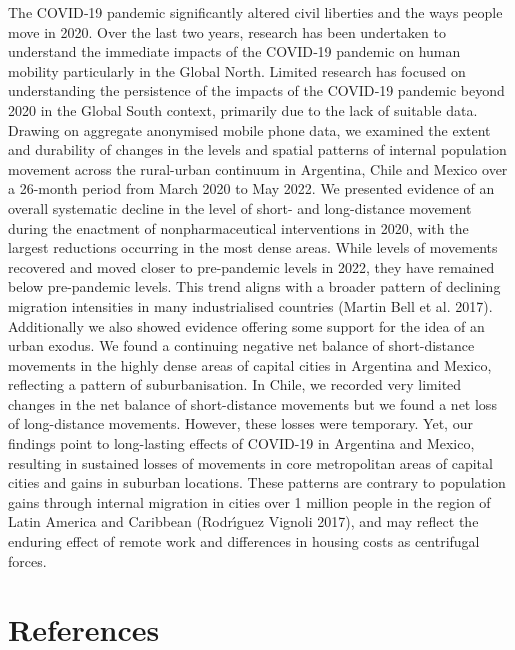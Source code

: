 \documentclass[
  11pt,
]{article}
\begin{document}
The COVID‐19 pandemic significantly altered civil liberties and the ways
people move in 2020. Over the last two years, research has been
undertaken to understand the immediate impacts of the COVID‐19 pandemic
on human mobility particularly in the Global North. Limited research has
focused on understanding the persistence of the impacts of the COVID‐19
pandemic beyond 2020 in the Global South context, primarily due to the
lack of suitable data. Drawing on aggregate anonymised mobile phone
data, we examined the extent and durability of changes in the levels and
spatial patterns of internal population movement across the rural-urban
continuum in Argentina, Chile and Mexico over a 26-month period from
March 2020 to May 2022. We presented evidence of an overall systematic
decline in the level of short- and long-distance movement during the
enactment of nonpharmaceutical interventions in 2020, with the largest
reductions occurring in the most dense areas. While levels of movements
recovered and moved closer to pre-pandemic levels in 2022, they have
remained below pre-pandemic levels. This trend aligns with a broader
pattern of declining migration intensities in many industrialised
countries (Martin Bell et al. 2017). Additionally we also showed
evidence offering some support for the idea of an urban exodus. We found
a continuing negative net balance of short-distance movements in the
highly dense areas of capital cities in Argentina and Mexico, reflecting
a pattern of suburbanisation. In Chile, we recorded very limited changes
in the net balance of short-distance movements but we found a net loss
of long-distance movements. However, these losses were temporary. Yet,
our findings point to long-lasting effects of COVID-19 in Argentina and
Mexico, resulting in sustained losses of movements in core metropolitan
areas of capital cities and gains in suburban locations. These patterns
are contrary to population gains through internal migration in cities
over 1 million people in the region of Latin America and Caribbean
(Rodrı́guez Vignoli 2017), and may reflect the enduring effect of remote
work and differences in housing costs as centrifugal forces.

\hypertarget{references}{%
\section*{References}\label{references}}
\end{document}
